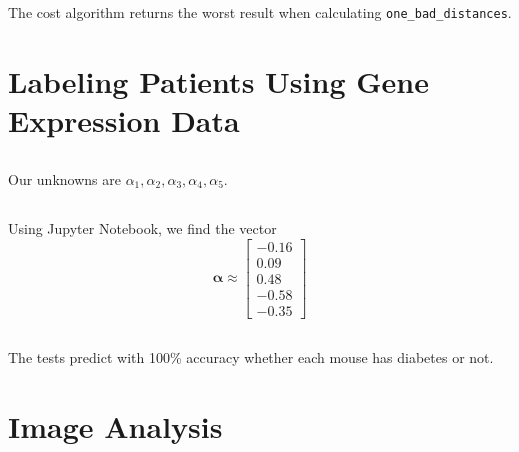 \documentclass[]{article}
\renewcommand{\vec}[1]{\bm{#1}}
\begin{document}
\subsection{}

The cost algorithm returns the worst result when calculating \texttt{one\_bad\_distances}. 

\section{Labeling Patients Using Gene Expression Data}

\subsection{}

Our unknowns are \(\alpha_1, \alpha_2, \alpha_3, \alpha_4, \alpha_5\). 

\subsection{}

Using Jupyter Notebook, we find the vector
\begin{equation}
	\vec{\alpha} \approx \begin{bmatrix}
	-0.16 \\
	0.09 \\
	0.48 \\
	-0.58 \\
	-0.35
	\end{bmatrix}
\end{equation}

\subsection{}

The tests predict with 100\% accuracy whether each mouse has diabetes or not. 

\section{Image Analysis}

\subsection{}
\end{document}
